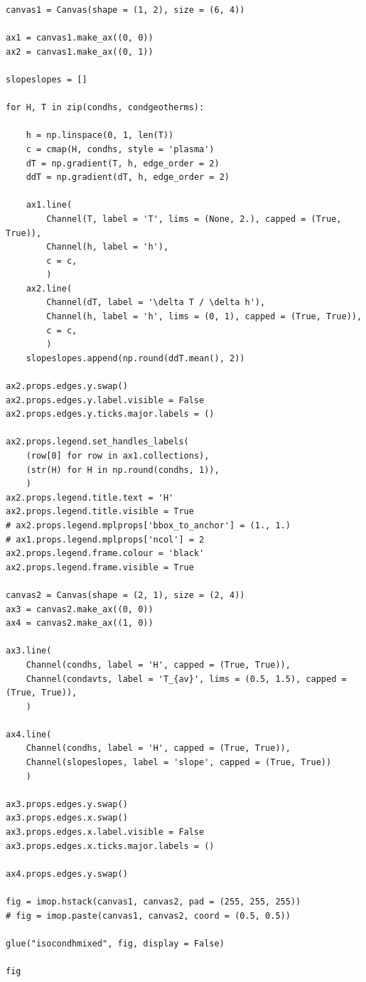 \begin{verbatim}
canvas1 = Canvas(shape = (1, 2), size = (6, 4))

ax1 = canvas1.make_ax((0, 0))
ax2 = canvas1.make_ax((0, 1))

slopeslopes = []

for H, T in zip(condhs, condgeotherms):

    h = np.linspace(0, 1, len(T))
    c = cmap(H, condhs, style = 'plasma')
    dT = np.gradient(T, h, edge_order = 2)
    ddT = np.gradient(dT, h, edge_order = 2)

    ax1.line(
        Channel(T, label = 'T', lims = (None, 2.), capped = (True, True)),
        Channel(h, label = 'h'),
        c = c,
        )
    ax2.line(
        Channel(dT, label = '\delta T / \delta h'),
        Channel(h, label = 'h', lims = (0, 1), capped = (True, True)),
        c = c,
        )
    slopeslopes.append(np.round(ddT.mean(), 2))

ax2.props.edges.y.swap()
ax2.props.edges.y.label.visible = False
ax2.props.edges.y.ticks.major.labels = ()

ax2.props.legend.set_handles_labels(
    (row[0] for row in ax1.collections),
    (str(H) for H in np.round(condhs, 1)),
    )
ax2.props.legend.title.text = 'H'
ax2.props.legend.title.visible = True
# ax2.props.legend.mplprops['bbox_to_anchor'] = (1., 1.)
# ax1.props.legend.mplprops['ncol'] = 2
ax2.props.legend.frame.colour = 'black'
ax2.props.legend.frame.visible = True

canvas2 = Canvas(shape = (2, 1), size = (2, 4))
ax3 = canvas2.make_ax((0, 0))
ax4 = canvas2.make_ax((1, 0))

ax3.line(
    Channel(condhs, label = 'H', capped = (True, True)),
    Channel(condavts, label = 'T_{av}', lims = (0.5, 1.5), capped = (True, True)),
    )

ax4.line(
    Channel(condhs, label = 'H', capped = (True, True)),
    Channel(slopeslopes, label = 'slope', capped = (True, True))
    )

ax3.props.edges.y.swap()
ax3.props.edges.x.swap()
ax3.props.edges.x.label.visible = False
ax3.props.edges.x.ticks.major.labels = ()

ax4.props.edges.y.swap()

fig = imop.hstack(canvas1, canvas2, pad = (255, 255, 255))
# fig = imop.paste(canvas1, canvas2, coord = (0.5, 0.5))

glue("isocondhmixed", fig, display = False)

fig


\end{verbatim}
